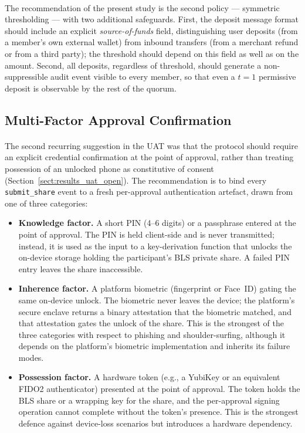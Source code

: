 \paragraph{}The recommendation of the present study is the second policy --- symmetric thresholding --- with two additional safeguards. First, the deposit message format should include an explicit \textit{source-of-funds} field, distinguishing user deposits (from a member's own external wallet) from inbound transfers (from a merchant refund or from a third party); the threshold should depend on this field as well as on the amount. Second, all deposits, regardless of threshold, should generate a non-suppressible audit event visible to every member, so that even a $t = 1$ permissive deposit is observable by the rest of the quorum.

\subsection{Multi-Factor Approval Confirmation}
\label{sect:rec_mfa}

\paragraph{}The second recurring suggestion in the UAT was that the protocol should require an explicit credential confirmation at the point of approval, rather than treating possession of an unlocked phone as constitutive of consent (Section~\ref{sect:results_uat_open}). The recommendation is to bind every \texttt{submit\_share} event to a fresh per-approval authentication artefact, drawn from one of three categories:

\begin{itemize}
  \item \textbf{Knowledge factor.} A short PIN (4--6 digits) or a passphrase entered at the point of approval. The PIN is held client-side and is never transmitted; instead, it is used as the input to a key-derivation function that unlocks the on-device storage holding the participant's BLS private share. A failed PIN entry leaves the share inaccessible.
  \item \textbf{Inherence factor.} A platform biometric (fingerprint or Face~ID) gating the same on-device unlock. The biometric never leaves the device; the platform's secure enclave returns a binary attestation that the biometric matched, and that attestation gates the unlock of the share. This is the strongest of the three categories with respect to phishing and shoulder-surfing, although it depends on the platform's biometric implementation and inherits its failure modes.
  \item \textbf{Possession factor.} A hardware token (e.g., a YubiKey or an equivalent FIDO2 authenticator) presented at the point of approval. The token holds the BLS share or a wrapping key for the share, and the per-approval signing operation cannot complete without the token's presence. This is the strongest defence against device-loss scenarios but introduces a hardware dependency.
\end{itemize}

